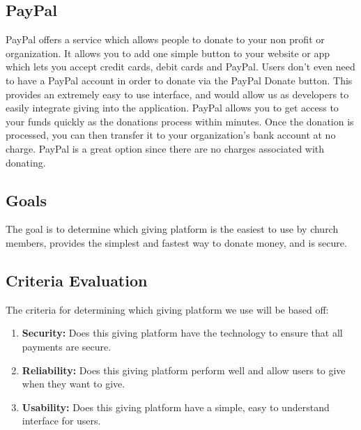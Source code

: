 \documentclass[letterpaper,10pt,draftclsnofoot,onecolumn,titlepage]{IEEEtran}
\begin{document}
	\subsection{PayPal}
		PayPal offers a service which allows people to donate to your non profit or organization. \cite{PayPal}
		It allows you to add one simple button to your website or app which lets you accept credit cards, debit cards and PayPal.
		Users don't even need to have a PayPal account in order to donate via the PayPal Donate button.
		This provides an extremely easy to use interface, and would allow us as developers to easily integrate giving into the application.
		PayPal allows you to get access to your funds quickly as the donations process within minutes.
		Once the donation is processed, you can then transfer it to your organization's bank account at no charge.
		PayPal is a great option since there are no charges associated with donating.

	\subsection{Goals}
		The goal is to determine which giving platform is the easiest to use by church members, provides the simplest and fastest way to donate money, and is secure.

	\subsection{Criteria Evaluation}
		The criteria for determining which giving platform we use will be based off:
		\begin{enumerate}
			\item \textbf{Security:} Does this giving platform have the technology to ensure that all payments are secure.
			\item \textbf{Reliability:} Does this giving platform perform well and allow users to give when they want to give.
			\item \textbf{Usability:} Does this giving platform have a simple, easy to understand interface for users.
		\end{enumerate}
	\clearpage
\end{document}
